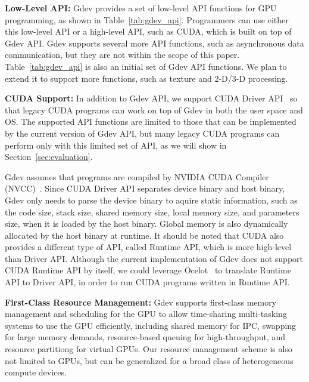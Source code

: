 \textbf{Low-Level API:}
Gdev provides a set of low-level API functions for GPU programming, as
shown in Table~\ref{tab:gdev_api}.
Programmers can use either this low-level API or a high-level API, such
as CUDA, which is built on top of Gdev API.
Gdev supports several more API functions, such as asynchronous data
communication, but they are not within the scope of this paper.
Table~\ref{tab:gdev_api} is also an initial set of Gdev API functions.
We plan to extend it to support more functions, such as texture and
2-D/3-D processing.

\textbf{CUDA Support:}
In addition to Gdev API, we support CUDA Driver API~\cite{CUDA40} so
that legacy CUDA programs can work on top of Gdev in both the user
space and OS.
The supported API functions are limited to those that can be implemented 
by the current version of Gdev API, but many legacy CUDA programs can
perform only with this limited set of API, as we will show in
Section~\ref{sec:evaluation}.

Gdev assumes that programs are compiled by NVIDIA CUDA Compiler
(NVCC)~\cite{CUDA40}.
Since CUDA Driver API separates device binary and host binary, Gdev only
needs to parse the device binary to aquire static information, such
as the code size, stack size, shared memory size, local memory size, and
parameters size, when it is loaded by the host binary.
Global memory is also dynamically allocated by the host binary at
runtime.
It should be noted that CUDA also provides a different type of API,
called Runtime API, which is more high-level than Driver API.
Although the current implementation of Gdev does not support CUDA
Runtime API by itself, we could leverage Ocelot~\cite{Diamos_PACT10} to
translate Runtime API to Driver API, in order to run CUDA programs
written in Runtime API.

\textbf{First-Class Resource Management:}
Gdev supports first-class memory management and scheduling for the GPU
to allow time-sharing multi-tasking systems to use the GPU efficiently,
including shared memory for IPC, swapping for large memory demands,
resource-based queuing for high-throughput, and resource partitiong
for virtual GPUs.
Our resource management scheme is also not limited to GPUs, but can be
generalized for a broad class of heterogeneous compute devices.

